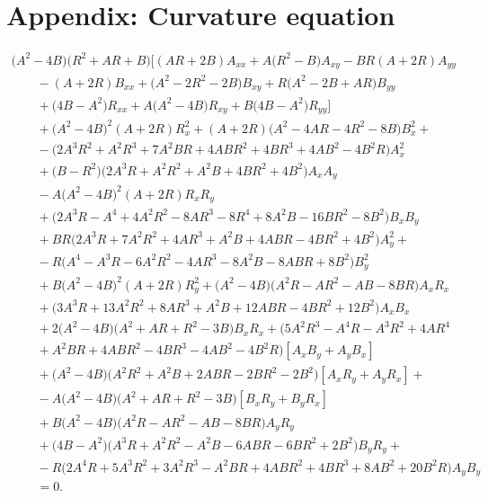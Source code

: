 \documentclass[11pt]{article}
\numberwithin{equation}{section}
\numberwithin{equation}{section}
\begin{document}
\section{Appendix: Curvature equation}\label{AppendixA}
\begin{gather*}
\bigl(A^2 - 4B\bigr)\bigl(R^2 +AR+ B\bigr)\bigl[(AR + 2B)A_{xx}+A\bigl(R^2-B\bigr)A_{xy}-BR(A + 2R)A_{yy}
\\
\qquad{}-(A + 2R)B_{xx}+ \bigl(A^2-2R^2- 2B\bigr)B_{xy}+R\bigl(A^2 -2B+AR\bigr)B_{yy}
\\
\qquad{}+\bigl(4B-A^2\bigr)R_{xx}+A\bigl(A^2 - 4B\bigr)R_{xy}+B\bigl(4B-A^2\bigr)R_{yy}\bigr]
\\
\qquad{}+\bigl(A^2 - 4B\bigr)^2(A + 2R)R_x^2+(A + 2R)\bigl(A^2 - 4AR - 4R^2 - 8B\bigr)B_x^2+
\\
\qquad{} - \bigl(2A^3R^2 + A^2R^3 + 7A^2BR + 4ABR^2 + 4BR^3 + 4AB^2 - 4B^2R\bigr)A_x^2
\\
\qquad{}+\bigl(B-R^2\bigr)\bigl(2A^3R + A^2R^2 + A^2B + 4BR^2 + 4B^2\bigr)A_xA_y \\
\qquad{}- A\bigl(A^2 - 4B\bigr)^2(A + 2R)R_xR_y
\\
\qquad{}+\bigl( 2A^3R-A^4 + 4A^2R^2 - 8AR^3 - 8R^4 + 8A^2B - 16BR^2 - 8B^2\bigr)B_xB_y
 \\
\qquad{}+BR\bigl(2A^3R + 7A^2R^2 + 4AR^3 + A^2B + 4ABR - 4BR^2 + 4B^2\bigr)A_y^2+
 \\
\qquad{}-R\bigl(A^4 - A^3R - 6A^2R^2 - 4AR^3 - 8A^2B - 8ABR + 8B^2\bigr)B_y^2
 \\
\qquad{}+B\bigl(A^2 - 4B\bigr)^2(A + 2R)R_y^2 +\bigl(A^2 - 4B\bigr)\bigl(A^2R - AR^2 - AB - 8BR\bigr)A_xR_x
 \\
\qquad{}+\bigl(3A^3R + 13A^2R^2 + 8AR^3 + A^2B + 12ABR - 4BR^2 + 12B^2\bigr)A_xB_x
 \\
\qquad{}+2\bigl(A^2 - 4B\bigr)\bigl(A^2 + AR + R^2 - 3B\bigr)B_xR_x
+\bigl( 5A^2R^3-A^4R - A^3R^2 + 4AR^4 \\
\qquad{} + A^2BR+ 4ABR^2 - 4BR^3 - 4AB^2 - 4B^2R\bigr)[A_xB_y+A_yB_x]
 \\
\qquad{}+\bigl(A^2 - 4B\bigr)\bigl(A^2R^2 + A^2B + 2ABR - 2BR^2 - 2B^2\bigr)[A_xR_y+A_yR_x] +
 \\
\qquad{}-A\bigl(A^2 - 4B\bigr)\bigl(A^2 + AR + R^2 - 3B\bigr)[B_xR_y+B_yR_x]
 \\
\qquad{}+B\bigl(A^2 - 4B\bigr)\bigl(A^2R - AR^2 - AB - 8BR\bigr)A_yR_y
 \\
\qquad{}+\bigl(4B-A^2 \bigr)\bigl(A^3R + A^2R^2 - A^2B - 6ABR - 6BR^2 + 2B^2\bigr)B_yR_y+
 \\
\qquad{}-R\bigl(2A^4R + 5A^3R^2 + 3A^2R^3 - A^2BR + 4ABR^2 + 4BR^3 + 8AB^2 + 20B^2R\bigr)A_yB_y \\
\qquad{}=0.
\end{gather*}
\end{document}
